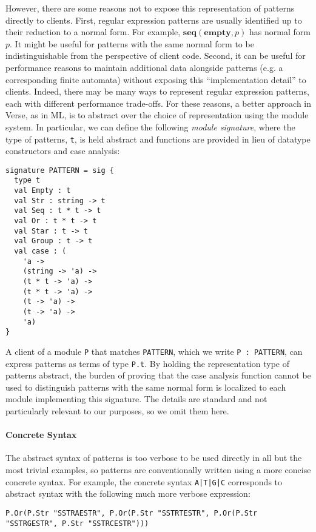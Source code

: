 However, there are some reasons not to expose this representation of patterns directly to clients. First, regular expression patterns are usually identified up to their reduction to a normal form. For example, $\textbf{seq}(\textbf{empty}, p)$ has normal form $p$. It might be useful for patterns with the same normal form to be  indistinguishable from the perspective of client code. Second, it can be useful for performance reasons to maintain additional data alongside patterns (e.g. a corresponding finite automata) without exposing this ``implementation detail'' to clients. Indeed, there may be many ways to represent regular expression patterns, each with different performance trade-offs. For these reasons, a better approach in Verse, as in ML, is to abstract over the choice of representation using  the module system. In particular, we can define the following \emph{module signature}, where the type of patterns, \lstinline{t}, is held abstract and functions are provided in lieu of datatype constructors and case analysis:

\begin{lstlisting}[deletekeywords={case},numbers=none]
signature PATTERN = sig {
  type t
  val Empty : t
  val Str : string -> t
  val Seq : t * t -> t
  val Or : t * t -> t
  val Star : t -> t
  val Group : t -> t
  val case : (
    'a -> 
    (string -> 'a) ->
    (t * t -> 'a) ->
    (t * t -> 'a) ->
    (t -> 'a) ->
    (t -> 'a) -> 
    'a)
}
\end{lstlisting}
 A client of a module \lstinline{P} that matches \lstinline{PATTERN}, which we write \lstinline{P : PATTERN}, can express patterns as terms of type \verb|P.t|. By holding the representation type of patterns abstract, the burden of proving that the case analysis function cannot be used to distinguish patterns with the same normal form is localized to each module implementing this signature. The details are standard and not particularly relevant to our purposes, so we omit them here.

\paragraph{Concrete Syntax} The abstract syntax of patterns is too verbose to be used directly in all but the most trivial examples, so patterns are conventionally written using a more concise concrete syntax. For example, the concrete syntax \lstinline{A|T|G|C} corresponds to abstract syntax with the following much more verbose expression:
\begin{lstlisting}[numbers=none,mathescape=|]
P.Or(P.Str "SSTRAESTR", P.Or(P.Str "SSTRTESTR", P.Or(P.Str "SSTRGESTR", P.Str "SSTRCESTR")))
\end{lstlisting} 



